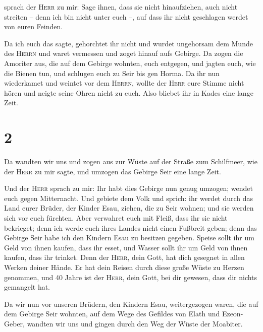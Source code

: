  sprach der \textsc{Herr} zu mir: Sage ihnen, dass sie
nicht hinaufziehen, auch nicht streiten -- denn ich bin nicht unter euch
--, auf dass ihr nicht geschlagen werdet von euren Feinden.

 Da ich euch das sagte, gehorchtet ihr nicht und wurdet
ungehorsam dem Munde des \textsc{Herrn} und waret vermessen und zoget
hinauf aufs Gebirge.  Da zogen die Amoriter aus, die auf
dem Gebirge wohnten, euch entgegen, und jagten euch, wie die Bienen tun,
und schlugen euch zu Seir bis gen Horma.  Da ihr nun
wiederkamet und weintet vor dem \textsc{Herrn}, wollte der \textsc{Herr}
eure Stimme nicht hören und neigte seine Ohren nicht zu euch.
 Also bliebet ihr in Kades eine lange Zeit.

\hypertarget{section-1}{%
\section{2}\label{section-1}}

 Da wandten wir uns und zogen aus zur Wüste auf der Straße
zum Schilfmeer, wie der \textsc{Herr} zu mir sagte, und umzogen das
Gebirge Seir eine lange Zeit.

 Und der \textsc{Herr} sprach zu mir:  Ihr
habt dies Gebirge nun genug umzogen; wendet euch gegen Mitternacht.
 Und gebiete dem Volk und sprich: ihr werdet durch das
Land eurer Brüder, der Kinder Esau, ziehen, die zu Seir wohnen; und sie
werden sich vor euch fürchten. Aber verwahret euch mit Fleiß,
 dass ihr sie nicht bekrieget; denn ich werde euch ihres
Landes nicht einen Fußbreit geben; denn das Gebirge Seir habe ich den
Kindern Esau zu besitzen gegeben.  Speise sollt ihr um
Geld von ihnen kaufen, dass ihr esset, und Wasser sollt ihr um Geld von
ihnen kaufen, dass ihr trinket.  Denn der \textsc{Herr},
dein Gott, hat dich gesegnet in allen Werken deiner Hände. Er hat dein
Reisen durch diese große Wüste zu Herzen genommen, und 40 Jahre ist der
\textsc{Herr}, dein Gott, bei dir gewesen, dass dir nichts gemangelt
hat.

 Da wir nun vor unseren Brüdern, den Kindern Esau,
weitergezogen waren, die auf dem Gebirge Seir wohnten, auf dem Wege des
Gefildes von Elath und Ezeon-Geber, wandten wir uns und gingen durch den
Weg der Wüste der Moabiter.

